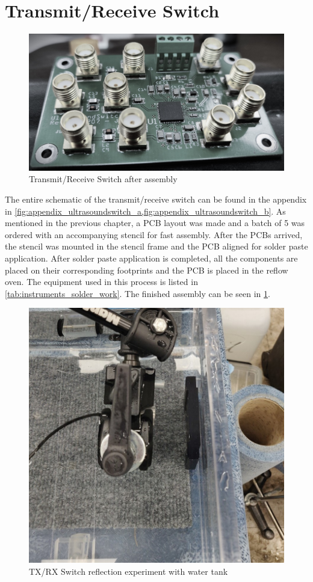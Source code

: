\section{Transmit/Receive Switch}
\begin{figure}[htbp]
	\centering
	\includegraphics[width=.8\textwidth]{Figures/4_switch_pcb_pic.jpg}
	\caption[Transmit/Receive Switch after assembly]{Transmit/Receive Switch after assembly}
	\label{fig:4_txrx_pcb}
\end{figure}
The entire schematic of the transmit/receive switch can be found in the appendix in \cref{fig:appendix_ultrasoundswitch_a,fig:appendix_ultrasoundswitch_b}. As mentioned in the previous chapter, a PCB layout was made and a batch of 5 was ordered with an accompanying stencil for fast assembly. After the PCBs arrived, the stencil was mounted in the stencil frame and the PCB aligned for solder paste application. After solder paste application is completed, all the components are placed on their corresponding footprints and the PCB is placed in the reflow oven. The equipment used in this process is listed in \cref{tab:instruments_solder_work}. The finished assembly can be seen in \cref{fig:4_txrx_pcb}.
\begin{figure}[htbp]
	\centering
	\includegraphics[width=.8\textwidth]{Figures/4_switch_meas_pic.jpg}
	\caption{TX/RX Switch reflection experiment with water tank}
	\label{fig:4_switch_meas_pic}
\end{figure}
